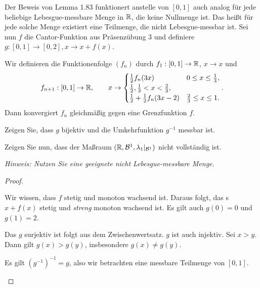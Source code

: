 \begin{Problem}
	Der Beweis von Lemma 1.83 funktionert anstelle von $[0,1]$ auch analog f\"{u}r jede beliebige Lebesgue-messbare Menge in $\mathbb{R}$, die keine Nullmenge ist. Das heißt f\"{u}r jede solche Menge existiert eine Teilmenge, die nicht Lebesgue-messbar ist.
	Sei nun $f$ die Cantor-Funktion aus Präsenzübung 3 und definiere $g:[0,1]\to [0,2],x\to x+f(x)$.
	\begin{tcolorbox}
		Wir definieren die Funktionenfolge $(f_n)$ durch $f_1:[0,1]\to \mathbb{R}$, $x\to x$ und
		\[
			f_{n+1}:[0,1]\to \mathbb{R},\qquad x\to \begin{cases}
				\frac{1}{2}f_n(3x) & 0 \le x \le \frac{1}{3},\\
				\frac{1}{2}, \frac{1}{3}<x<\frac{2}{3},\\
				\frac{1}{2}+\frac{1}{2}f_n(3x-2) & \frac{2}{3}\le x \le 1.
			\end{cases}
		.\] 
		Dann konvergiert $f_n$ gleichmäßig gegen eine Grenzfunktion $f$.
	\end{tcolorbox}
	\begin{parts}
		\item Zeigen Sie, dass $g$ bijektiv und die Umkehrfunktion $g^{-1}$ messbar ist.
		\item Zeigen Sie nun, dass der Maßraum $(\mathbb{R}, \mathcal{B}^1, \lambda_1|_{\mathcal{B}^1})$ nicht vollständig ist.
			
			{\footnotesize \emph{Hinweis: Nutzen Sie eine geeignete nicht Lebesgue-messbare Menge.}}
	\end{parts}
\end{Problem}
\begin{proof}
	\begin{parts}
	\item Wir wissen, dass $f$ stetig und monoton wachsend ist.  Daraus folgt, das s $x+f(x)$ stetig und \emph{streng} monoton wachsend ist. Es gilt auch $g(0)=0$ und $g(1)=2$. 

		Das $g$ surjektiv ist folgt aus dem Zwischenwertsatz. $g$ ist auch injektiv. Sei $x>y$. Dann gilt $g(x)>g(y)$, insbesondere $g(x)\neq g(y)$.

		Es gilt $(g^{-1})^{-1}=g$, also wir betrachten eine messbare Teilmenge von $[0,1]$.  
	\end{parts}
\end{proof}
